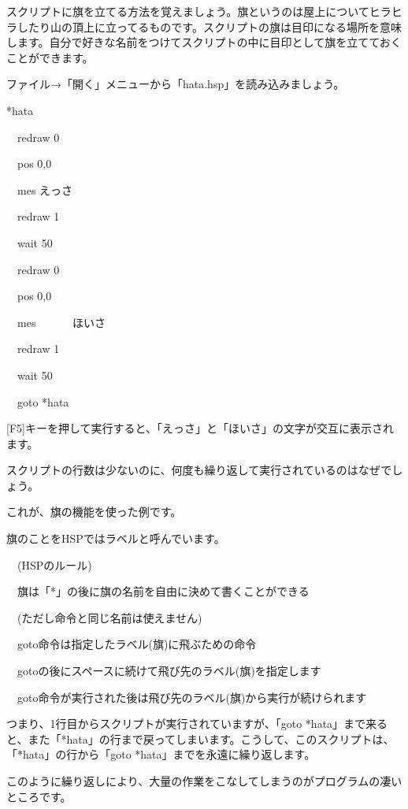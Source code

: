 \documentclass[a4paper,dvipdfmx]{jarticle}
\begin{document}
\bigskip

スクリプトに旗を立てる方法を覚えましょう。旗というのは屋上についてヒラヒラしたり山の頂上に立ってるものです。スクリプトの旗は目印になる場所を意味します。自分で好きな名前をつけてスクリプトの中に目印として旗を立てておくことができます。

ファイル→「開く」メニューから「hata.hsp」を読み込みましょう。


\bigskip

*hata

\ \ redraw 0

\ \ pos 0,0

\ \ mes {\textquotedbl}えっさ{\textquotedbl}

\ \ redraw 1

\ \ wait 50

\ \ redraw 0

\ \ pos 0,0

\ \ mes {\textquotedbl}　　　ほいさ{\textquotedbl}

\ \ redraw 1

\ \ wait 50

\ \ goto *hata


\bigskip

[F5]キーを押して実行すると、「えっさ」と「ほいさ」の文字が交互に表示されます。

スクリプトの行数は少ないのに、何度も繰り返して実行されているのはなぜでしょう。

これが、旗の機能を使った例です。

旗のことをHSPではラベルと呼んでいます。


\bigskip

\ \ (HSPのルール)


\bigskip

\ \ 旗は「*」の後に旗の名前を自由に決めて書くことができる

\ \ (ただし命令と同じ名前は使えません)

\ \ goto命令は指定したラベル(旗)に飛ぶための命令

\ \ gotoの後にスペースに続けて飛び先のラベル(旗)を指定します

\ \ goto命令が実行された後は飛び先のラベル(旗)から実行が続けられます


\bigskip

つまり、1行目からスクリプトが実行されていますが、「goto
*hata」まで来ると、また「*hata」の行まで戻ってしまいます。こうして、このスクリプトは、「*hata」の行から「goto
*hata」までを永遠に繰り返します。

このように繰り返しにより、大量の作業をこなしてしまうのがプログラムの凄いところです。
\end{document}
